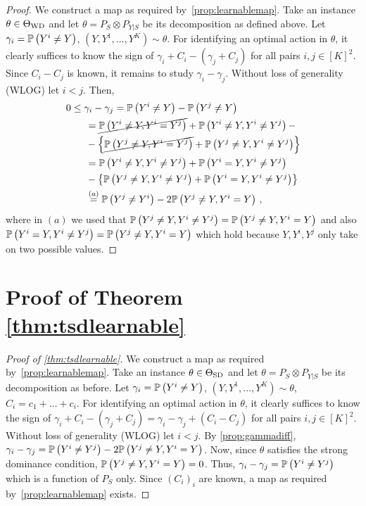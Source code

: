 \begin{proof}
	
	We construct a map as required by~\cref{prop:learnablemap}.
	Take an instance $\theta \in \Theta_{\mathrm{WD}}$ and let $\theta = P_S \otimes P_{Y|S}$ be its decomposition
	as defined above.
	Let $\gamma_i = \mathbb{P}\left(Y^i \ne Y\right)$, $(Y,Y^1,\dots,Y^K)\sim \theta$.
	For identifying an optimal action in $\theta$, it clearly suffices
	to know the sign of $\gamma_i + C_i - (\gamma_j +C_j)$ for all pairs $i,j\in [K]^2$.
	Since $C_i - C_j$ is known, it remains to study $\gamma_i-\gamma_j$.
	Without loss of generality (WLOG) let $i<j$.
	Then, 
	\begin{align*}
	\MoveEqLeft 0  \le \gamma_i  - \gamma_j = \Prob{Y^i\ne Y} - \Prob{Y^j\ne Y} \\
	& = \cancel{\Prob{Y^i\ne Y, Y^i=Y^j}} + \Prob{ Y^i\ne Y, Y^i\ne Y^j } - \\
	& - \left\{ 
	\cancel{\Prob{Y^j\ne Y, Y^i=Y^j}} + \Prob{ Y^j\ne Y, Y^i\ne Y^j }\right\}\\
	& = \Prob{ Y^i\ne Y, Y^i \ne Y^j } + \Prob{Y^i=Y,Y^i\ne Y^j}       \\
	& - \left\{ 
	\Prob{ Y^j \ne Y, Y^i\ne Y^j } + \Prob{ Y^i=Y,Y^i\ne Y^j}
	\right\}\\
	& \stackrel{\footnotesize (a)}{=} \Prob{ Y^j \ne Y^i } -2 \Prob{ Y^j\ne Y, Y^i = Y }\,,
	\end{align*}
	where in $(a)$ we used that $\mathbb{P}\left( Y^j \ne Y, Y^i\ne Y^j \right) =  \mathbb{P}\left( Y^j\ne Y,Y^i= Y\right)$ and also
	$\mathbb{P}\left( Y^i=Y,Y^i\ne Y^j\right) = \mathbb{P}\left( Y^j\ne Y,Y^i= Y\right)$
	which hold because $Y,Y^i,Y^j$ only take on two possible values.
\end{proof}
\section*{Proof of  Theorem \ref{thm:tsdlearnable}}
\begin{proof}[Proof of \cref{thm:tsdlearnable}]
	We construct a map as required by~\cref{prop:learnablemap}.
	Take an instance $\theta \in \Theta_{\mathrm{SD}}$ and let $\theta = P_S \otimes P_{Y|S}$ be its decomposition as before.
	Let $\gamma_i = \mathbb{P}\left(Y^i \ne Y\right)$, $(Y,Y^1,\dots,Y^K)\sim \theta$, $C_i = c_1+\dots+c_i$.
	For identifying an optimal action in $\theta$, it clearly suffices
	to know the sign of $\gamma_i + C_i - (\gamma_j +C_j) = \gamma_i-\gamma_j + (C_i-C_j)$ for all pairs $i,j\in [K]^2$.
	Without loss of generality (WLOG) let $i<j$. By \cref{prop:gammadiff},
	$\gamma_i - \gamma_j = \mathbb{P}\left( Y^i \ne Y^j \right) -2 \mathbb{P}\left( Y^j\ne Y, Y^i = Y \right)$.
	Now, since $\theta$ satisfies the strong dominance condition, $ \mathbb{P}\left( Y^j\ne Y, Y^i = Y \right) = 0$.
	Thus, $\gamma_i - \gamma_j = \mathbb{P}\left( Y^i \ne Y^j \right)$
	which is a function of $P_S$ only.
	Since $(C_i)_i$ are known, a map as required by~\cref{prop:learnablemap} exists.
\end{proof}

